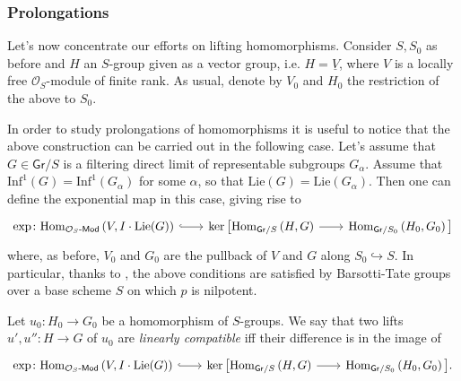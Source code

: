 \subsubsection{Prolongations}
Let's now concentrate our efforts on lifting homomorphisms.
Consider $S, S_0$ as before and
$H$ an $S$-group given as a vector group,
i.e. $H = \underline{V}$, where $V$ is a locally free $\mathcal{O}_{ S }$-module
of finite rank.
As usual, denote by $V_0$ and $H_0$ the restriction of the above to $S_0$.


\begin{rem}
	In order to study prolongations of homomorphisms it is useful to notice that
	the above construction can be carried out in the following case.
	Let's assume that $G \in \mathsf{Gr}/S$ is a filtering direct limit of
	representable subgroups $G_\alpha$.
	Assume that $\mathrm{Inf}^1(G) = \mathrm{Inf}^1(G_\alpha)$ for some $\alpha$,
	so that $\mathrm{Lie}(G) = \mathrm{Lie}(G_\alpha)$.
	Then one can define the exponential map in this case, giving rise to
	\begin{equation*}
	\begin{tikzcd}[row sep = 0ex, column sep = 2.0em
		,/tikz/column 1/.append style={anchor=base east}
		,/tikz/column 2/.append style={anchor=base west}]
		\exp\colon
		\mathrm{Hom}_{ \mathcal{O}_{ S }\text{-}\mathsf{Mod} }
		\left( V, I \cdot \mathrm{Lie}(G) \right)
		\arrow[r, "", hookrightarrow] &
		\ker \big[ 
		\mathrm{Hom}_{ \mathsf{Gr}/S } 
		\left( H, G \right)
		\arrow[r, "", rightarrow] &
		\mathrm{Hom}_{ \mathsf{Gr}/S_0 }
		\left( H_0, G_0 \right)
		\big]
	\end{tikzcd}
	\end{equation*} 
	where, as before, $V_0$ and $G_0$ are the pullback of $V$ and $G$ 
	along $S_0 \hookrightarrow S$.
	In particular, thanks to \cite[Chapter II, Corollary 3.3.16]{Messing},
	the above conditions are satisfied by Barsotti-Tate
	groups over a base scheme $S$ on which $p$ is nilpotent.
\end{rem}


\begin{defn}\label{defn:LinCompProlong}
	Let $u_0\colon H_0 \to G_0$ be a homomorphism of $S$-groups.
	We say that two lifts $u', u''\colon H \to G$ of $u_0$
	are {\em linearly compatible} iff their difference is in the image
	of 
	\begin{equation*}
	\begin{tikzcd}[row sep = 0ex, column sep = 2.0em
		,/tikz/column 1/.append style={anchor=base east}
		,/tikz/column 2/.append style={anchor=base west}]
		\exp\colon
		\mathrm{Hom}_{ \mathcal{O}_{ S }\text{-}\mathsf{Mod} }
		\left( V, I \cdot \mathrm{Lie}(G) \right)
		\arrow[r, "", hookrightarrow] &
		\ker \big[ 
		\mathrm{Hom}_{ \mathsf{Gr}/S } 
		\left( H, G \right)
		\arrow[r, "", rightarrow] &
		\mathrm{Hom}_{ \mathsf{Gr}/S_0 }
		\left( H_0, G_0 \right)
		\big]
	.\end{tikzcd}
	\end{equation*} 
\end{defn}


